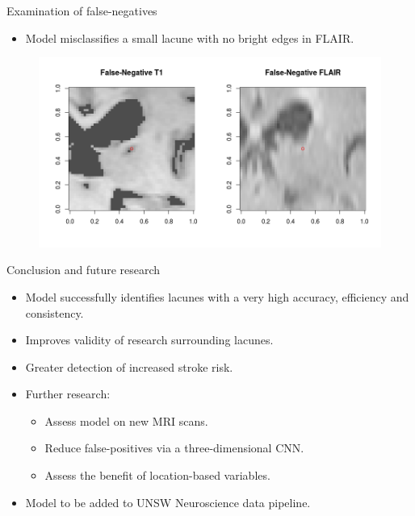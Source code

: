 \documentclass{beamer}
\begin{document}
\begin{frame}{Examination of false-negatives}
\begin{itemize}
\item Model misclassifies a small lacune with no bright edges in FLAIR.
\end{itemize}
\begin{figure}
\centering
\includegraphics[width=\linewidth]{../Thesis_Docs/Images/7_FN_t1_flair.png}
\end{figure}
\end{frame}


\begin{frame}{Conclusion and future research}
\begin{itemize}
\item Model successfully identifies lacunes with a very high accuracy, efficiency and consistency.
\item Improves validity of research surrounding lacunes.
\item Greater detection of increased stroke risk.
\item Further research:
\begin{itemize}
\item Assess model on new MRI scans.
\item Reduce false-positives via a three-dimensional CNN.
\item Assess the benefit of location-based variables.
\end{itemize}
\item Model to be added to UNSW Neuroscience data pipeline.
\end{itemize}

\end{frame}
\end{document}
